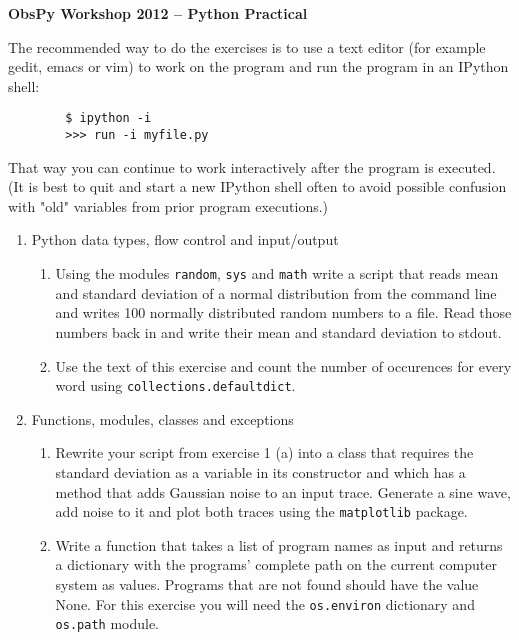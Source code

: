 \documentclass{article}
\begin{document}
\begin{center}
\textbf{\Large ObsPy Workshop 2012 -- Python Practical}
\end{center}
\vspace*{1cm}

\noindent The recommended way to do the exercises is to use a text editor
(for example gedit, emacs or vim) to work on the program and run the program in
an IPython shell:
\begin{verbatim}
        $ ipython -i
        >>> run -i myfile.py
\end{verbatim}
That way you can continue to work interactively after the program is executed.
(It is best to quit and start a new IPython shell often to avoid possible confusion
with "old" variables from prior program executions.)

\begin{enumerate}

  \item Python data types, flow control and input/output
  \begin{enumerate}
    \item Using the modules \verb#random#, \verb#sys# and \verb#math# write a
    script that reads mean and standard deviation of a normal distribution from 
    the command line and writes 100
	normally distributed random numbers to a file.
	Read those numbers back in and write their mean
	and standard deviation to stdout.
	\item Use the text of this exercise and count the number of occurences for
	every word using \verb#collections.defaultdict#. 
  \end{enumerate}

  \item Functions, modules, classes and exceptions
  \begin{enumerate}
    \item Rewrite your script from exercise 1 (a) into a class that requires
	the standard deviation as a variable in its constructor
	and which has a method that adds Gaussian noise to an
	input trace. Generate a sine wave, add noise to it and plot
	both traces using the \verb#matplotlib# package.
	\item Write a function that takes a list of program 
	names as input and returns a dictionary with 
	the programs' complete path on the current computer
	system as values. Programs that are not found should
	have the value None.
	For this exercise you will need the \verb#os.environ# dictionary and
	\verb#os.path# module.
    \end{enumerate}


\end{enumerate}
\end{document}
